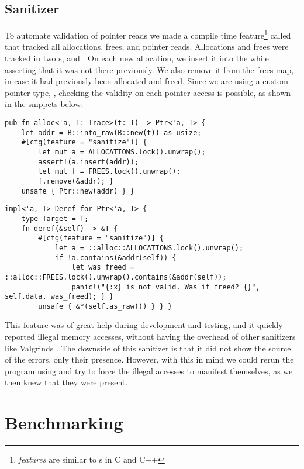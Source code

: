 \subsection{Sanitizer\label{sec:sanitizer}}

To automate validation of pointer reads we made a compile time feature\footnote{\emph{features} are
similar to s in C and C++} called  that tracked all allocations,
frees, and pointer reads.  Allocations and frees were tracked in two s,
 and .  On each new allocation, we insert it into the 
while asserting that it was not there previously. We also remove it from the frees map, in case it
had previously been allocated and freed. Since we are using a custom pointer type, ,
checking the validity on each pointer access is possible, as shown in the snippets below:

\begin{lstlisting}[style=Rust]
pub fn alloc<'a, T: Trace>(t: T) -> Ptr<'a, T> {
    let addr = B::into_raw(B::new(t)) as usize;
    #[cfg(feature = "sanitize")] {
        let mut a = ALLOCATIONS.lock().unwrap();
        assert!(a.insert(addr));
        let mut f = FREES.lock().unwrap();
        f.remove(&addr); }
    unsafe { Ptr::new(addr) } } \end{lstlisting}

\begin{lstlisting}[style=Rust]
impl<'a, T> Deref for Ptr<'a, T> {
    type Target = T;
    fn deref(&self) -> &T {
        #[cfg(feature = "sanitize")] {
            let a = ::alloc::ALLOCATIONS.lock().unwrap();
            if !a.contains(&addr(self)) {
                let was_freed = ::alloc::FREES.lock().unwrap().contains(&addr(self));
                panic!("{:x} is not valid. Was it freed? {}", self.data, was_freed); } }
        unsafe { &*(self.as_raw()) } } }
\end{lstlisting}


This feature was of great help during development and testing, and it quickly reported illegal
memory accesses, without having the overhead of other sanitizers like Valgrinds .
The downside of this sanitizer is that it did not show the source of the errors, only their
presence. However, with this in mind we could rerun the program using  and try to
force the illegal accesses to manifest themselves, as we then knew that they were present.



\section{Benchmarking\label{sec:methods-benchmarking}}


